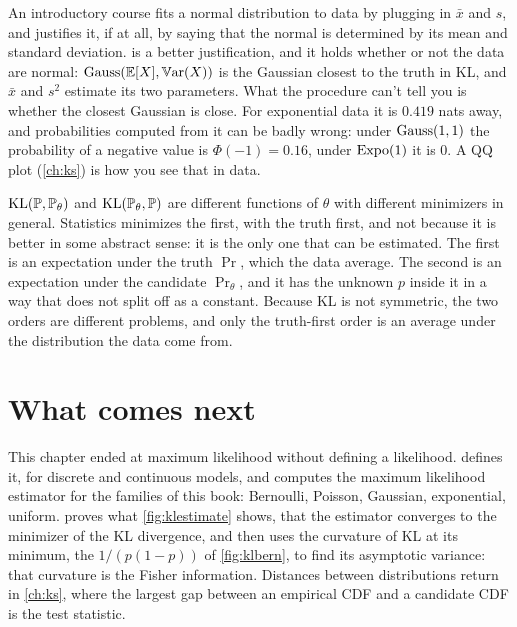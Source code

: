 \begin{bridge}
An introductory course fits a normal distribution to data by plugging in $\bar{x}$ and $s$, and justifies it, if at all, by saying that the normal is determined by its mean and standard deviation.
 is a better justification, and it holds whether or not the data are normal: $\text{Gauss}(\operatorname*{\mathbb{E}}[X], \operatorname*{\mathbb{V}\text{ar}}(X))$ is the Gaussian closest to the truth in KL, and $\bar{x}$ and $s^2$ estimate its two parameters.
What the procedure can't tell you is whether the closest Gaussian is close.
For exponential data it is $0.419$ nats away, and probabilities computed from it can be badly wrong: under $\text{Gauss}(1, 1)$ the probability of a negative value is $\Phi(-1) = 0.16$, under $\text{Expo}(1)$ it is $0$.
A QQ plot (\cref{ch:ks}) is how you see that in data.
\end{bridge}

\begin{pitfall}
$\mathrm{KL}(\mathbb{P}, \mathbb{P}_\theta)$ and $\mathrm{KL}(\mathbb{P}_\theta, \mathbb{P})$ are different functions of $\theta$ with different minimizers in general.
Statistics minimizes the first, with the truth first, and not because it is better in some abstract sense: it is the only one that can be estimated.
The first is an expectation under the truth $\Pr$, which the data average.
The second is an expectation under the candidate $\Pr_\theta$, and it has the unknown $p$ inside it in a way that does not split off as a constant.
Because KL is not symmetric, the two orders are different problems, and only the truth-first order is an average under the distribution the data come from.
\end{pitfall}

\section{What comes next}
\label{sec:dist-next}

This chapter ended at maximum likelihood without defining a likelihood.
 defines it, for discrete and continuous models, and computes the maximum likelihood estimator for the families of this book: Bernoulli, Poisson, Gaussian, exponential, uniform.
 proves what \cref{fig:klestimate} shows, that the estimator converges to the minimizer of the KL divergence, and then uses the curvature of KL at its minimum, the $1/(p(1-p))$ of \cref{fig:klbern}, to find its asymptotic variance: that curvature is the Fisher information.
Distances between distributions return in \cref{ch:ks}, where the largest gap between an empirical CDF and a candidate CDF is the test statistic.

